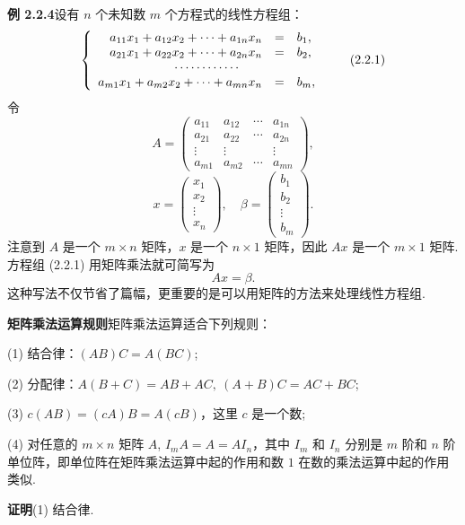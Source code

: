 \documentclass[UTF8,12pt,a4paper,fontset=fandol]{ctexart}
\begin{document}
\noindent\textbf{例 2.2.4}\quad 设有 $n$ 个未知数 $m$ 个方程式的线性方程组：
\begin{equation}
\left\{\begin{array}{rcl}
a_{11}x_1+a_{12}x_2+\cdots+a_{1n}x_n&=&b_1,\\
a_{21}x_1+a_{22}x_2+\cdots+a_{2n}x_n&=&b_2,\\
\multicolumn{3}{c}{\cdots\cdots\cdots\cdots}\\
a_{m1}x_1+a_{m2}x_2+\cdots+a_{mn}x_n&=&b_m,
\end{array}\right.
\tag{2.2.1}
\end{equation}
令
\[
A=\left(\begin{array}{cccc}
a_{11} & a_{12} & \cdots & a_{1n}\\
a_{21} & a_{22} & \cdots & a_{2n}\\
\vdots & \vdots & & \vdots\\
a_{m1} & a_{m2} & \cdots & a_{mn}
\end{array}\right),
\]
\[
x=\left(\begin{array}{c}
x_1\\
x_2\\
\vdots\\
x_n
\end{array}\right),\quad
\beta=\left(\begin{array}{c}
b_1\\
b_2\\
\vdots\\
b_m
\end{array}\right).
\]
注意到 $A$ 是一个 $m\times n$ 矩阵，$x$ 是一个 $n\times 1$ 矩阵，因此 $Ax$ 是一个 $m\times 1$ 矩阵. 方程组 (2.2.1) 用矩阵乘法就可简写为
\begin{equation}
Ax=\beta.
\tag{2.2.2}
\end{equation}
这种写法不仅节省了篇幅，更重要的是可以用矩阵的方法来处理线性方程组.

\noindent\textbf{矩阵乘法运算规则}\quad 矩阵乘法运算适合下列规则：

(1) 结合律：$(AB)C=A(BC)$;

(2) 分配律：$A(B+C)=AB+AC,\ (A+B)C=AC+BC$;

(3) $c(AB)=(cA)B=A(cB)$，这里 $c$ 是一个数;

(4) 对任意的 $m\times n$ 矩阵 $A$, $I_mA=A=AI_n$，其中 $I_m$ 和 $I_n$ 分别是 $m$ 阶和 $n$ 阶单位阵，即单位阵在矩阵乘法运算中起的作用和数 $1$ 在数的乘法运算中起的作用类似.

\noindent\textbf{证明}\quad (1) 结合律.
\end{document}
